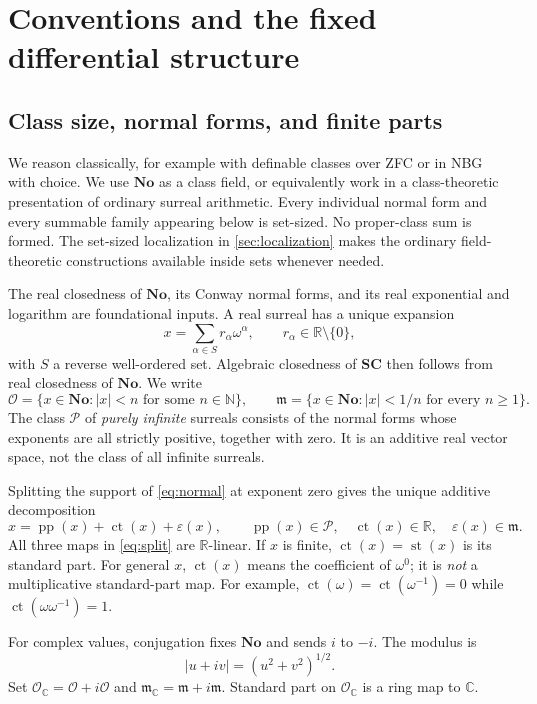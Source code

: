 \documentclass[11pt,letterpaper]{article}
\numberwithin{equation}{section}
\theoremstyle{definition}
\theoremstyle{remark}
\newcommand{\No}{\mathbf{No}}
\newcommand{\SC}{\mathbf{SC}}
\newcommand{\R}{\mathbb R}
\newcommand{\C}{\mathbb C}
\newcommand{\N}{\mathbb N}
\newcommand{\OO}{\mathcal O}
\newcommand{\mm}{\mathfrak m}
\newcommand{\PPi}{\mathcal P}
\newcommand{\pp}{\operatorname{pp}}
\newcommand{\st}{\operatorname{st}}
\newcommand{\ct}{\operatorname{ct}}
\newcommand{\eps}{\varepsilon}
\begin{document}
\section{Conventions and the fixed differential structure}\label{sec:base}

\subsection{Class size, normal forms, and finite parts}
We reason classically, for example with definable classes over ZFC or in NBG with choice. We use $\No$ as a class field, or equivalently work in a class-theoretic presentation of ordinary surreal arithmetic. Every individual normal form and every summable family appearing below is set-sized. No proper-class sum is formed. The set-sized localization in \cref{sec:localization} makes the ordinary field-theoretic constructions available inside sets whenever needed.

The real closedness of $\No$, its Conway normal forms, and its real exponential and logarithm are foundational inputs. A real surreal has a unique expansion
\begin{equation}\label{eq:normal}
 x=\sum_{\alpha\in S}r_\alpha\omega^\alpha,
 \qquad r_\alpha\in\R\setminus\{0\},
\end{equation}
with $S$ a reverse well-ordered set. Algebraic closedness of $\SC$ then follows from real closedness of $\No$. We write
\[
 \OO=\{x\in\No:|x|<n\text{ for some }n\in\N\},\qquad
 \mm=\{x\in\No:|x|<1/n\text{ for every }n\geq1\}.
\]
The class $\PPi$ of \emph{purely infinite} surreals consists of the normal forms whose exponents are all strictly positive, together with zero. It is an additive real vector space, not the class of all infinite surreals.

Splitting the support of \eqref{eq:normal} at exponent zero gives the unique additive decomposition
\begin{equation}\label{eq:split}
 x=\pp(x)+\ct(x)+\eps(x),\qquad
 \pp(x)\in\PPi,\quad \ct(x)\in\R,\quad \eps(x)\in\mm.
\end{equation}
All three maps in \eqref{eq:split} are $\R$-linear. If $x$ is finite, $\ct(x)=\st(x)$ is its standard part. For general $x$, $\ct(x)$ means the coefficient of $\omega^0$; it is \emph{not} a multiplicative standard-part map. For example, $\ct(\omega)=\ct(\omega^{-1})=0$ while $\ct(\omega\omega^{-1})=1$.

For complex values, conjugation fixes $\No$ and sends $i$ to $-i$. The modulus is
\[
 |u+iv|=(u^2+v^2)^{1/2}.
\]
Set $\OO_\C=\OO+i\OO$ and $\mm_\C=\mm+i\mm$. Standard part on $\OO_\C$ is a ring map to $\C$.
\end{document}
